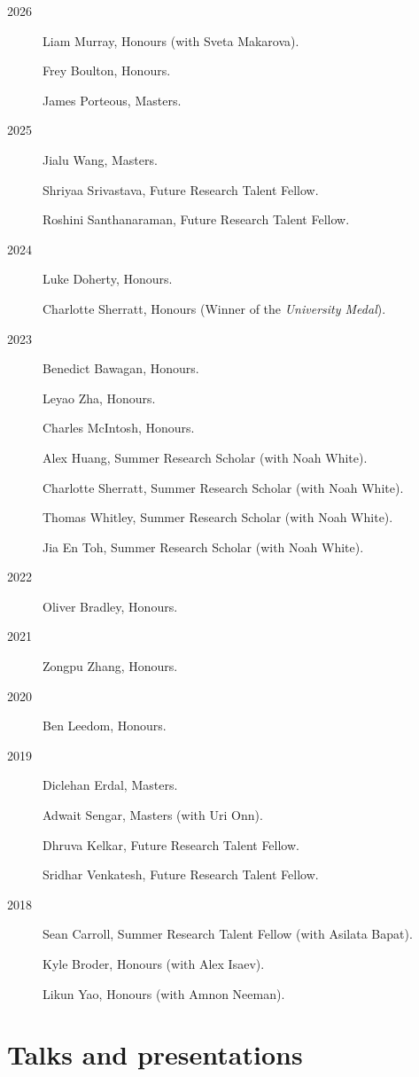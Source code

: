 \documentclass[11pt]{article}
\begin{document}
\label{org3aa111c}
\begin{description}
\item[{2026}] Liam Murray, Honours (with Sveta Makarova).

Frey Boulton, Honours.

James Porteous, Masters.
\item[{2025}] Jialu Wang, Masters.

Shriyaa Srivastava, Future Research Talent Fellow.

Roshini Santhanaraman, Future Research Talent Fellow.
\item[{2024}] Luke Doherty, Honours.

Charlotte Sherratt, Honours (Winner of the \emph{University Medal}).
\item[{2023}] Benedict Bawagan, Honours.

Leyao Zha, Honours.

Charles McIntosh, Honours.

Alex Huang, Summer Research Scholar (with Noah White).

Charlotte Sherratt, Summer Research Scholar (with Noah White).

Thomas Whitley, Summer Research Scholar (with Noah White).

Jia En Toh, Summer Research Scholar (with Noah White).
\item[{2022}] Oliver Bradley, Honours.
\item[{2021}] Zongpu Zhang, Honours.
\item[{2020}] Ben Leedom, Honours.
\item[{2019}] Diclehan Erdal, Masters.

Adwait Sengar, Masters (with Uri Onn).

Dhruva Kelkar, Future Research Talent Fellow.

Sridhar Venkatesh, Future Research Talent Fellow.
\item[{2018}] Sean Carroll, Summer Research Talent Fellow (with Asilata Bapat).

Kyle Broder, Honours (with Alex Isaev).

Likun Yao, Honours (with Amnon Neeman).
\end{description}
\section*{Talks and presentations}
\label{sec:org09d6174}
\end{document}
